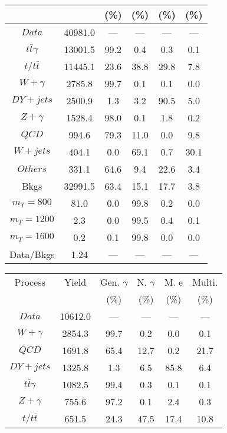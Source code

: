 \begin{figure}
\begin{minipage}[c]{0.32\textwidth}
{\begin{tabular}{cccccc}
 &  & (\%) & (\%) & (\%) & (\%)  \\
\hline
                                                                      $ Data $ &  40981.0 &  --- &  --- &  --- &  ---\\
$ t\bar{t}\gamma $ &  13001.5 &  99.2 &  0.4 &  0.3 &  0.1\\
$ t/t\bar{t} $ &  11445.1 &  23.6 &  38.8 &  29.8 &  7.8\\
$ W+\gamma $ &  2785.8 &  99.7 &  0.1 &  0.1 &  0.0\\
$ DY+jets $ &  2500.9 &  1.3 &  3.2 &  90.5 &  5.0\\
$ Z+\gamma $ &  1528.4 &  98.0 &  0.1 &  1.8 &  0.2\\
$ QCD $ &  994.6 &  79.3 &  11.0 &  0.0 &  9.8\\
$ W+jets $ &  404.1 &  0.0 &  69.1 &  0.7 &  30.1\\
$ Others $ &  331.1 &  64.6 &  9.4 &  22.6 &  3.4\\
Bkgs &  32991.5 &  63.4 &  15.1 &  17.7 &  3.8\\
$ m_{T} = 800 $ &  81.0 &  0.0 &  99.8 &  0.2 &  0.0\\
$ m_{T} = 1200 $ &  2.3 &  0.0 &  99.5 &  0.4 &  0.1\\
$ m_{T} = 1600 $ &  0.2 &  0.1 &  99.8 &  0.0 &  0.0\\
Data/Bkgs &  1.24 &  --- &  --- &  --- &  ---\\
\hline
\end{tabular}
}
\end{minipage}
\begin{minipage}[c]{0.32\textwidth}
\centering
\tiny{
\begin{tabular}{cccccc}
\hline
Process & Yield & Gen. $\gamma$ & N. $\gamma$ & M. e & Multi. \\
 &  & (\%) & (\%) & (\%) & (\%)  \\
\hline
                                                                      $ Data $ &  10612.0 &  --- &  --- &  --- &  ---\\
$ W+\gamma $ &  2854.3 &  99.7 &  0.2 &  0.0 &  0.1\\
$ QCD $ &  1691.8 &  65.4 &  12.7 &  0.2 &  21.7\\
$ DY+jets $ &  1325.8 &  1.3 &  6.5 &  85.8 &  6.4\\
$ t\bar{t}\gamma $ &  1082.5 &  99.4 &  0.3 &  0.1 &  0.1\\
$ Z+\gamma $ &  755.6 &  97.2 &  0.1 &  2.4 &  0.3\\
$ t/t\bar{t} $ &  651.5 &  24.3 &  47.5 &  17.4 &  10.8\\

\end{tabular}}
\end{minipage}
\end{figure}
